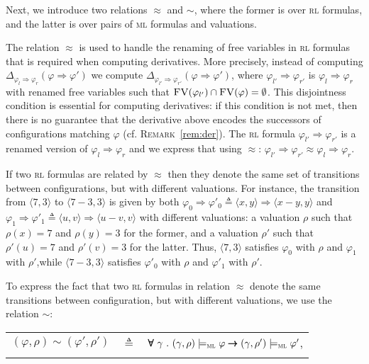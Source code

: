 \documentclass[conference]{IEEEtran}
\newenvironment{todo}{\medskip\hrule\smallskip\noindent}{\smallskip\hrule\medskip}
\newcommand{\vr}[1]{\begin{todo}\textcolor{blue}{Vlad:}\\ \color{orange}{#1}\color{black}\end{todo}}
\renewcommand{\aa}[1]{\begin{todo}\textcolor{OliveGreen}{Andrei:}\\ \color{OliveGreen}{#1}\color{black}\end{todo}}
\newcommand{\vr}[1]{}
\renewcommand{\aa}[1]{}
\newcommand{\eqbydef}{\triangleq}
\newcommand{\Ra}{\Rightarrow}
\newcommand{\FreeVars}{\mathit{\textsc{FV}}}
\newcommand{\ML}{\textsc{ml}\xspace}
\newcommand{\RL}{\textsc{rl}\xspace}
\newcommand{\rrule}[2]{{#1} \Ra{#2}}
\newcommand{\modelsml}{\models_\ML}
\newcommand{\cforall}{\pmb{\forall}}
\newcommand{\cimplies}{\pmb{\rightarrow}}
\begin{document}
Next, we introduce two relations $\approx$ and $\sim$, where the former is over \RL formulas, and the latter is over pairs of \ML formulas and valuations. 

The relation $\approx$ is used to handle the renaming of free variables in \RL formulas that is required when computing derivatives.
More precisely, instead of computing $\Delta_{\rrule{\varphi_l}{\varphi_r}}(\rrule{\varphi}{\varphi'})$ we compute $\Delta_{\rrule{\varphi_{l'}}{\varphi_{r'}}}(\rrule{\varphi}{\varphi'})$, where $\rrule{\varphi_{l'}}{\varphi_{r'}}$ is $\rrule{\varphi_l}{\varphi_r}$ with renamed free variables such that $\FreeVars(\varphi_{l'}) \cap \FreeVars(\varphi) = \emptyset$.
This disjointness condition is essential for computing derivatives:  if this condition is not met, then there is no guarantee that the derivative above encodes the successors of configurations matching $\varphi$ (cf. \textsc{Remark}~\ref{rem:der}).
The \RL formula $\rrule{\varphi_{l'}}{\varphi_{r'}}$ is a renamed version of $\rrule{\varphi_l}{\varphi_r}$ and we express that using $\approx$: $\rrule{\varphi_{l'}}{\varphi_{r'}} \approx \rrule{\varphi_l}{\varphi_r}$. 

If two \RL formulas are related by $\approx$ then they denote the same set of transitions between configurations, but with different valuations. 
For instance, the transition from $\langle 7, 3 \rangle$ to $\langle 7 - 3, 3 \rangle$ is given by both %
 $\rrule{\varphi_0}{\varphi'_0} \eqbydef \rrule{\langle x , y \rangle}{\langle x - y, y \rangle}$ and $\rrule{\varphi_1}{\varphi'_1} \eqbydef \rrule{\langle u , v \rangle}{\langle u - v, v \rangle}$ with different valuations: a valuation $\rho$ such that $\rho(x) = 7$ and $\rho(y) = 3$ for the former, and a valuation $\rho'$ such that $\rho'(u) = 7$ and $\rho'(v) = 3$ for the latter.
Thus, $\langle 7, 3 \rangle$ satisfies $\varphi_0$ with $\rho$ and $\varphi_1$ with $\rho'$,while $\langle 7-3, 3 \rangle$ satisfies $\varphi'_0$ with $\rho$ and $\varphi'_1$ with $\rho'$.

To express the fact that two \RL formulas in relation $\approx$ denote the same transitions between configuration, but with different valuations, we use the relation $\sim$:\\[1ex]

\noindent
\begin{minipage}{\textwidth}
\begin{tabular}{lcl}
$(\varphi, \rho) \sim (\varphi', \rho')$ & $\eqbydef$ & $\cforall~\gamma~.~ (\gamma, \rho) \modelsml \varphi \cimplies (\gamma, \rho') \modelsml \varphi'$, \\\\
\end{tabular}
\end{minipage}
\end{document}
